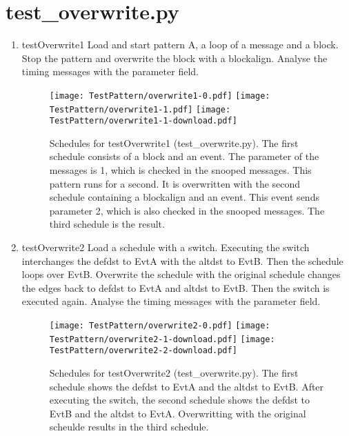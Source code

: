 \documentclass[12pt,a4paper]{report}
\begin{document}
\section{test\_overwrite.py}
\begin{enumerate}
\item testOverwrite1
    Load and start pattern A, a loop of a message and a block.
    Stop the pattern and overwrite the block with a blockalign.
    Analyse the timing messages with the parameter field.
    \begin{figure}
        \centering
        \texttt{[image: TestPattern/overwrite1-0.pdf]}
        \texttt{[image: TestPattern/overwrite1-1.pdf]}
        \texttt{[image: TestPattern/overwrite1-1-download.pdf]}
        \caption{Schedules for testOverwrite1 (test\_overwrite.py). The first schedule
        consists of a block and an event. The parameter of the messages is 1,
        which is checked in the snooped messages. This pattern runs for a second.
        It is overwritten with the second schedule containing a blockalign and an event.
        This event sends parameter 2, which is also checked in the snooped messages.
        The third schedule is the result.}
        \label{fig:Schedules_for_testOverwrite1}
    \end{figure}

\item testOverwrite2
    Load a schedule with a switch. Executing the switch interchanges
    the defdst to EvtA with the altdst to EvtB. Then the schedule loops
    over EvtB.
    Overwrite the schedule with the original schedule changes the edges back
    to defdst to EvtA and altdst to EvtB. Then the switch is executed again.
    Analyse the timing messages with the parameter field.
    \begin{figure}
        \centering
        \texttt{[image: TestPattern/overwrite2-0.pdf]}
        \texttt{[image: TestPattern/overwrite2-1-download.pdf]}
        \texttt{[image: TestPattern/overwrite2-2-download.pdf]}
        \caption{Schedules for testOverwrite2 (test\_overwrite.py). The first
        schedule shows the defdst to EvtA and the altdst to EvtB. After executing
        the switch, the second schedule shows the defdst to EvtB and the altdst to EvtA.
        Overwritting with the original scheulde results in the third schedule.}
        \label{fig:Schedules_for_testOverwrite2}
    \end{figure}


\end{enumerate}
\end{document}
